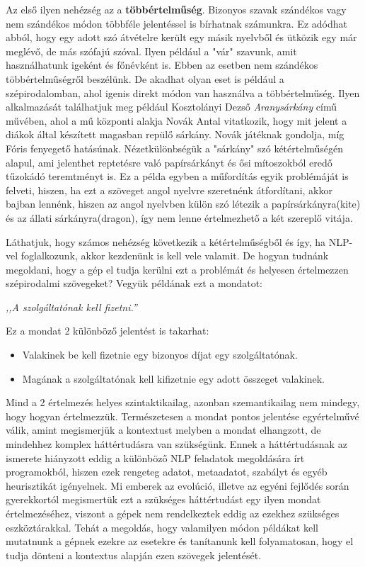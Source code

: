 Az első ilyen nehézség az a \textbf{többértelműség}. Bizonyos szavak szándékos vagy nem szándékos módon többféle jelentéssel is bírhatnak számunkra. Ez adódhat abból, hogy egy adott szó átvételre került egy másik nyelvből és ütközik egy már meglévő, de más szófajú szóval. Ilyen például a "vár" szavunk, amit használhatunk igeként és főnévként is. Ebben az esetben nem szándékos többértelműségről beszélünk. De akadhat olyan eset is például a szépirodalomban, ahol igenis direkt módon van használva a többértelműség. Ilyen alkalmazását találhatjuk meg például Kosztolányi Dezső \textit{Aranysárkány} című művében, ahol a mű központi alakja Novák Antal vitatkozik, hogy mit jelent a diákok által készített magasban repülő sárkány. Novák játéknak gondolja, míg Fóris fenyegető hatásúnak. Nézetkülönbségük a "sárkány" szó kétértelműségén alapul, ami jelenthet reptetésre való papírsárkányt és ősi mítoszokból eredő tűzokádó teremtményt is. Ez a példa egyben a műfordítás egyik problémáját is felveti, hiszen, ha ezt a szöveget angol nyelvre szeretnénk átfordítani, akkor bajban lennénk, hiszen az angol nyelvben külön szó létezik a papírsárkányra(kite) és az állati sárkányra(dragon), így nem lenne értelmezhető a két szereplő vitája.

Láthatjuk, hogy számos nehézség következik a kétértelműségből és így, ha NLP-vel foglalkozunk, akkor kezdenünk is kell vele valamit. De hogyan tudnánk megoldani, hogy a gép el tudja kerülni ezt a problémát és helyesen értelmezzen szépirodalmi szövegeket? 
Vegyük példának ezt a mondatot:

\vspace{0.5cm}
\centerline{\textit{,,A szolgáltatónak kell fizetni.''}}
\vspace{0.5cm}

\noindent Ez a mondat 2 különböző jelentést is takarhat:

\begin{itemize}
\item Valakinek be kell fizetnie egy bizonyos díjat egy szolgáltatónak.
\item Magának a szolgáltatónak kell kifizetnie egy adott összeget valakinek.
\end{itemize}

Mind a 2 értelmezés helyes szintaktikailag, azonban szemantikailag nem mindegy, hogy hogyan értelmezzük. Természetesen a mondat pontos jelentése egyértelművé válik, amint megismerjük a kontextust  melyben a mondat elhangzott, de mindehhez komplex háttértudásra van szükségünk. Ennek a háttértudásnak az ismerete hiányzott eddig a különböző NLP feladatok megoldására írt programokból, hiszen ezek rengeteg adatot, metaadatot, szabályt és egyéb heurisztikát igényelnek. Mi emberek az evolúció, illetve az egyéni fejlődés során gyerekkortól megismertük ezt a szükséges háttértudást egy ilyen mondat értelmezéséhez, viszont a gépek nem rendelkeztek eddig az ezekhez szükséges eszköztárakkal. Tehát a megoldás, hogy valamilyen módon példákat kell mutatnunk a gépnek ezekre az esetekre és tanítanunk kell folyamatosan, hogy el tudja dönteni a kontextus alapján ezen szövegek jelentését.

